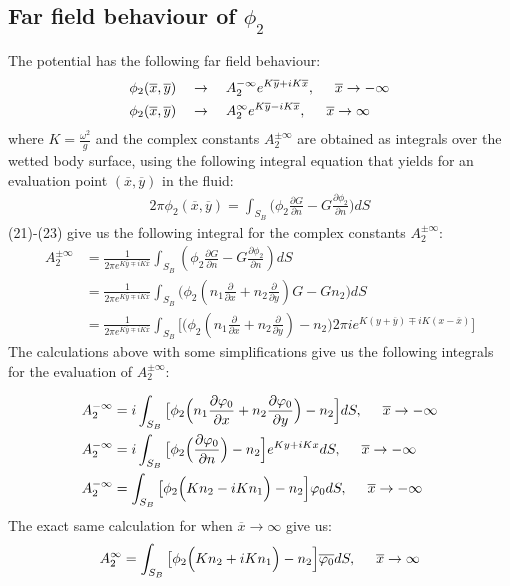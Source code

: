 \documentclass[a4paper,10pt]{article}
\newcommand{\dd}{\partial}
\newcommand{\xbar}{\overline{x}}
\newcommand{\ybar}{\overline{y}}
\begin{document}
\subsection{Far field behaviour of $\phi_2$}
The potential has the following far field behaviour:
\begin{align}
\phi_2 (\xbar, \ybar) \quad &\rightarrow \quad A_2^{-\infty} e^{K \ybar + i K \xbar} ,  \hspace*{0.5cm} \xbar \rightarrow - \infty \\
\phi_2 (\xbar, \ybar) \quad &\rightarrow \quad A_2^{\infty} e^{K \ybar - i K \xbar} ,  \hspace*{0.5cm} \xbar \rightarrow \infty
\end{align}
where $K = \frac{\omega^2}{g}$ and the complex constants $A_2^{\pm \infty}$ are obtained as integrals over the wetted body surface, using the following integral equation that yields for an evaluation point $(\xbar, \ybar)$ in the fluid:
\begin{align}
2 \pi \phi_2(\xbar, \ybar) = \int_{S_B} \Big(\phi_2 \frac{\dd G}{\dd n} - G \frac{\dd \phi_2}{\dd n}\Big) dS
\end{align}
(21)-(23) give us the following integral for the complex constants $A_2^{\pm \infty}$:
\begin{align}
A_2^{\pm \infty} &= \frac{1}{2 \pi e^{K \ybar \mp i K \xbar}} \int_{S_B} (\phi_2 \frac{\dd G}{\dd n} - G \frac{\dd \phi_2}{\dd n}) dS\\
&=  \frac{1}{2 \pi e^{K \ybar \mp i K \xbar}} \int_{S_B} \bigg(\phi_2(n_1 \frac{\dd}{\dd x} + n_2 \frac{\dd}{\dd y})G - G n_2\bigg) dS\\
&=  \frac{1}{2 \pi e^{K \ybar \mp i K \xbar}} \int_{S_B} \Bigg[ \bigg( \phi_2 (n_1 \frac{\dd}{\dd x} +n_2 \frac{\dd}{\dd y}) - n_2 \bigg) 2 \pi i e^{K(y + \ybar) \mp iK(x-\xbar)} \Bigg]
\end{align}
The calculations above with some simplifications give us the following integrals for the evaluation of $A_2^{\pm \infty}$:

\begin{align}
&A_2^{-\infty} = i \int_{S_B} \big[ \phi_2 \Big( n_1 \frac{\dd \varphi_0 }{\dd x} + n_2 \frac{\dd \varphi_0}{\dd y} \Big) - n_2 \Big] d S, \hspace*{0.5cm} \xbar \rightarrow - \infty\\
&A_2^{-\infty} = i \int_{S_B} \big[ \phi_2 \Big( \frac{\dd \varphi_0}{\dd n} \Big) - n_2 \Big] e^{K y + i K x} d S, \hspace*{0.5cm} \xbar \rightarrow - \infty\\
&A_2^{-\infty} = \int_{S_B} \big[  \phi_2 \Big( K n_2 - i K n_1  \Big) - n_2 \Big] \varphi_0 d S, \hspace*{0.5cm} \xbar \rightarrow - \infty
\end{align}
The exact same calculation for when $\xbar \rightarrow \infty$ give us:
\begin{equation}
A_2^{\infty} = \int_{S_B} \big[  \phi_2 \Big( K n_2 + i K n_1  \Big) - n_2 \Big] \overline{\varphi_0} d S, \hspace*{0.5cm} \xbar \rightarrow \infty
\end{equation}
\end{document}
